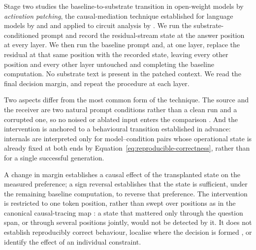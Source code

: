Stage two studies the baseline-to-substrate transition in open-weight
models by \emph{activation patching}, the causal-mediation technique
established for language models by \citet{vig2020causal} and
\citet{meng2022locating} and applied to circuit analysis by
\citet{wang2023interpretability}. We run the substrate-conditioned
prompt and record the residual-stream state at the answer position at
every layer. We then run the baseline prompt and, at one layer, replace
the residual at that same position with the recorded state, leaving
every other position and every other layer untouched and completing the
baseline computation. No substrate text is present in the patched
context. We read the final decision margin, and repeat the procedure at
each layer.

Two aspects differ from the most common form of the technique. The
source and the receiver are two natural prompt conditions rather than a
clean run and a corrupted one, so no noised or ablated input enters the
comparison \citep{zhang2024towards}. And the intervention is anchored to
a behavioural transition established in advance: internals are
interpreted only for model--condition pairs whose operational state is
already fixed at both ends by
Equation~\eqref{eq:reproducible-correctness}, rather than for a single
successful generation.

A change in margin establishes a causal effect of the transplanted
state on the measured preference; a sign reversal establishes that the
state is sufficient, under the remaining baseline computation, to
reverse that preference. The intervention is restricted to one token
position, rather than swept over positions as in the canonical
causal-tracing map \citep{meng2022locating}: a state that mattered only
through the question span, or through several positions jointly, would
not be detected by it. It does not establish reproducibly correct
behaviour, localise where the decision is formed
\citep{zhang2024towards}, or identify the effect of an individual
constraint.
